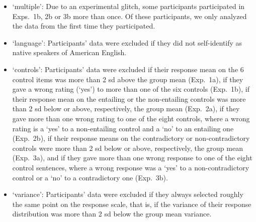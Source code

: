 \documentclass[11pt,fleqn]{article}
\newcommand{\6}{\mbox{$[\hspace*{-.6mm}[$}}
\newcommand{\9}{\mbox{$]\hspace*{-.6mm}]$}}
\begin{document}
\begin{itemize}[topsep = -1ex,itemsep=-2pt]

\item `multiple': Due to an experimental glitch, some participants participated in Exps.~1b, 2b or 3b more than once. Of these participants, we only analyzed the data from the first time they participated.

\item `language': Participants' data were excluded if they did not self-identify as native speakers of American English.

\item `controls': Participants' data were excluded if their response mean on the 6 control items was more than 2 sd above the group mean (Exp.~1a), if they gave a wrong rating (`yes') to more than one of the six controls (Exp.~1b), if their response mean on the entailing or the non-entailing controls was more than 2 sd below or above, respectively, the group mean (Exp.~2a), if they gave more than one wrong rating to one of the eight controls, where a wrong rating is a `yes' to a non-entailing control and a `no' to an entailing one (Exp.~2b), if their response means on the contradictory or non-contradictory controls were more than 2 sd below or above, respectively, the group mean (Exp.~3a), and if they gave more than one wrong response to one of the eight control sentences, where a wrong response was a `yes' to a non-contradictory control or a `no' to a contradictory one (Exp.~3b).

\item `variance': Participants' data were excluded if they always selected roughly the same point on the response scale, that is, if the variance of their response distribution was more than 2 sd below the group mean variance.

\end{itemize}
\end{document}

